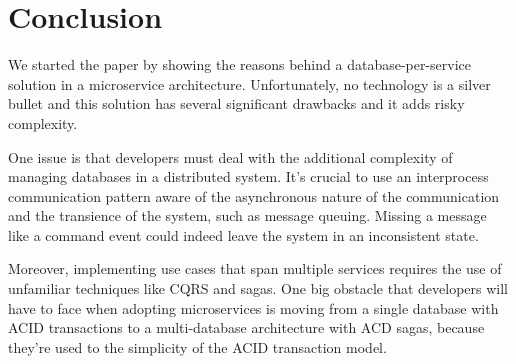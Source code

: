 \documentclass[conference]{IEEEtran}
\begin{document}
%





\section{Conclusion}

We started the paper by showing the reasons behind a database-per-service solution in a microservice architecture. Unfortunately, no technology is a silver bullet and this solution has several significant drawbacks and it adds risky complexity.

One issue is that developers must deal with the additional complexity of managing databases in a distributed system. It's crucial to use an interprocess communication pattern aware of the asynchronous nature of the communication and the transience of the system, such as message queuing. Missing a message like a command event could indeed leave the system in an inconsistent state.

Moreover, implementing use cases that span multiple services requires the use of unfamiliar techniques like CQRS and sagas. One big obstacle that developers will have to face when adopting microservices is moving from a single database with ACID transactions to a multi-database architecture with ACD sagas, because they’re used to the simplicity of the ACID transaction model.
\end{document}
